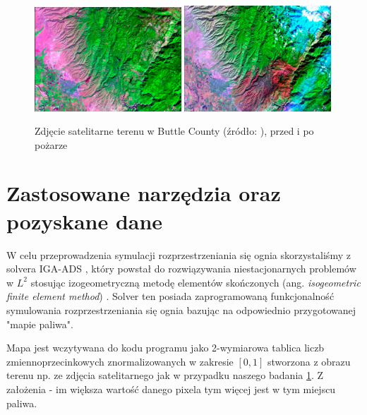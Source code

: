 \documentclass{article}
\begin{document}
    \begin{figure}[!htpb]
        \centering
        \includegraphics[width=0.49\textwidth]{resources/forest_map.png}\hfill
        \includegraphics[width=0.49\textwidth]{resources/forest_map_burn.png}
        \caption{Zdjęcie satelitarne terenu w Buttle County (źródło: \cite{camp-fire-wildfire-in-california}), przed i po pożarze}
        \label{fig:buttle-county-fire-sat-photo}
    \end{figure}

\section{Zastosowane narzędzia oraz pozyskane dane}
\label{chap:tools-and-data}

    W celu przeprowadzenia symulacji rozprzestrzeniania się ognia skorzystaliśmy z solvera IGA-ADS \cite{iga-ads-solver-github}, który powstał do rozwiązywania niestacjonarnych problemów w \( L^2 \) stosując izogeometryczną metodę elementów skończonych (ang. \textit{isogeometric finite element method}) \cite{LOS201799}. Solver ten posiada zaprogramowaną funkcjonalność symulowania rozprzestrzeniania się ognia bazując na odpowiednio przygotowanej "mapie paliwa".
    
    Mapa jest wczytywana do kodu programu jako 2-wymiarowa tablica liczb zmiennoprzecinkowych znormalizowanych w zakresie \( [0,1] \) stworzona z obrazu terenu np. ze zdjęcia satelitarnego jak w przypadku naszego badania \ref{fig:buttle-county-fire-sat-photo}. Z założenia - im większa wartość danego pixela tym więcej jest w tym miejscu paliwa.
\end{document}
